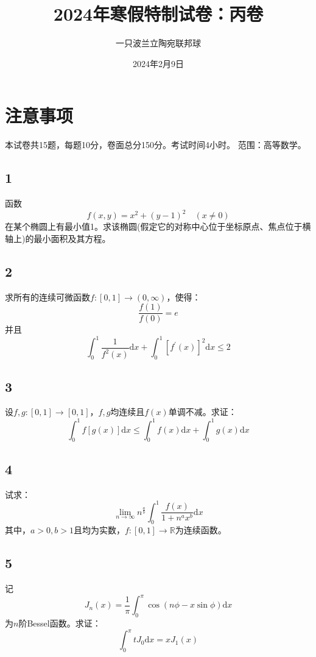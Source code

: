 \documentclass[a4paper,12pt]{article}
\title{2024年寒假特制试卷：丙卷}
\author{一只波兰立陶宛联邦球}
\date{2024年2月9日}
\begin{document}
\maketitle
\section*{注意事项}
本试卷共15题，每题10分，卷面总分150分。考试时间4小时。
范围：高等数学。
\subsection*{1}\noindent 函数
\begin{equation*}
	f\left(x,y\right)=x^{2}+\left(y-1\right)^{2}\quad\left(x\neq0\right)
\end{equation*}
在某个椭圆上有最小值1。求该椭圆(假定它的对称中心位于坐标原点、焦点位于横轴上)的最小面积及其方程。
\subsection*{2}\noindent 求所有的连续可微函数$f:\left[0,1\right]\rightarrow\left(0,\infty\right)$，使得：
\begin{equation*}
	\frac{f\left(1\right)}{f\left(0\right)}=e
\end{equation*}并且
\begin{equation*}
	\int_{0}^{1}\frac{1}{f^2(x)}\mathrm{d}x+\int_{0}^{1}[f^{\prime}\left(x\right)]^2\mathrm{d}x\leq2
\end{equation*}
\subsection*{3}\noindent 设$f,g:\left[0,1\right]\rightarrow\left[0,1\right]$，$f,g$均连续且$f(x)$单调不减。求证：
\begin{equation*}
	\int_{0}^{1}f\left[g\left(x\right)\right]\mathrm{d}x\leq\int_{0}^{1}f\left(x\right)\mathrm{d}x+\int_{0}^{1}g\left(x\right)\mathrm{d}x
\end{equation*}
\subsection*{4}\noindent 试求：
\begin{equation*}
	\lim\limits_{n\rightarrow\infty}n^{\frac{a}{b}}\int_{0}^{1}\frac{f\left(x\right)}{1+n^{a}x^{b}}\mathrm{d}x
\end{equation*}
其中，$a>0,b>1$且均为实数，$f:\left[0,1\right]\rightarrow\mathbb{R}$为连续函数。
\subsection*{5}\noindent 记
\begin{equation*}
	J_{n}\left(x\right)=\frac{1}{\pi}\int_{0}^{\pi}\cos\left(n\phi-x\sin\phi\right)\mathrm{d}x
\end{equation*}
为$n$阶Bessel函数。求证：
\begin{equation*}
	\int_{0}^{\pi}tJ_{0}\mathrm{d}x=xJ_{1}\left(x\right)
\end{equation*}
\end{document}
